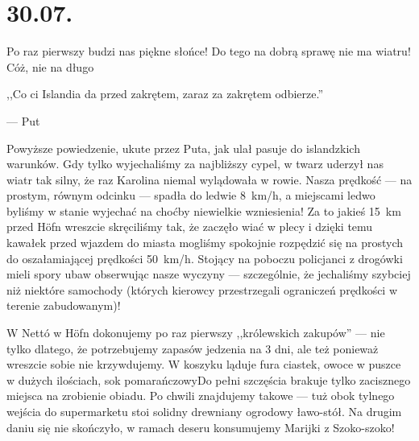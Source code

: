 \chapter*{30.07.}

Po raz pierwszy budzi nas piękne słońce! Do tego na dobrą sprawę nie ma wiatru! Cóż, nie na długo\textellipsis

\epigraph{,,Co ci Islandia da przed zakrętem, zaraz za zakrętem odbierze.''}{--- \textup{Put}}

Powyższe powiedzenie, ukute przez Puta, jak ulał pasuje do islandzkich warunków. Gdy tylko wyjechaliśmy za najbliższy cypel, w twarz uderzył nas wiatr tak silny, że raz Karolina niemal wylądowała w rowie. Nasza prędkość --- na prostym, równym odcinku --- spadła do ledwie 8~km/h, a miejscami ledwo byliśmy w stanie wyjechać na choćby niewielkie wzniesienia! Za to jakieś 15~km przed Höfn wreszcie skręciliśmy tak, że zaczęło wiać w plecy i dzięki temu kawałek przed wjazdem do miasta mogliśmy spokojnie rozpędzić się na prostych do oszałamiającej prędkości 50~km/h. Stojący na poboczu policjanci z drogówki mieli spory ubaw obserwując nasze wyczyny --- szczególnie, że jechaliśmy szybciej niż niektóre samochody (których kierowcy przestrzegali ograniczeń prędkości w terenie zabudowanym)!



W Nettó w Höfn dokonujemy po raz pierwszy ,,królewskich zakupów'' --- nie tylko dlatego, że potrzebujemy zapasów jedzenia na 3 dni, ale też ponieważ wreszcie sobie nie krzywdujemy. W koszyku ląduje fura ciastek, owoce w puszce w dużych ilościach, sok pomarańczowy\textellipsis Do pełni szczęścia brakuje tylko zacisznego miejsca na zrobienie obiadu. Po chwili znajdujemy takowe --- tuż obok tylnego wejścia do supermarketu stoi solidny drewniany ogrodowy ławo-stół. Na drugim daniu się nie skończyło, w ramach deseru konsumujemy Marijki z Szoko-szoko!

